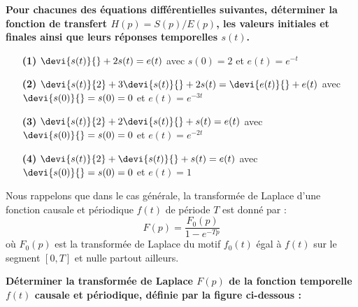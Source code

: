 \question{}
\textbf{Pour chacunes des équations différentielles suivantes, 
déterminer la fonction de transfert $H(p) = S(p)/E(p)$, les valeurs initiales
et finales ainsi que leurs réponses temporelles $s(t)$.}
\begin{itemize}
\item[\textbf{(1)}] $\devi{s(t)}{} + 2s(t) = e(t) $ avec $s(0)=2$ 
                    et $e(t) = e^{-t}$
\item[\textbf{(2)}] $\devi{s(t)}{2} + 3 \devi{s(t)}{} + 2s(t) 
                    = \devi{e(t)}{} + e(t)$ 
                    avec $\devi{s(0)}{}=s(0)=0$ et $e(t) = e^{-3t}$
\item[\textbf{(3)}] $\devi{s(t)}{2} + 2\devi{s(t)}{} + s(t)  = e(t)$ 
                    avec $\devi{s(0)}{}=s(0)=0$ et $e(t) = e^{-2t}$
\item[\textbf{(4)}] $\devi{s(t)}{2} + \devi{s(t)}{} + s(t) = e(t)$ 
                    avec $\devi{s(0)}{}=s(0)=0$ et $e(t) = 1$
\end{itemize}

Nous rappelons que dans le cas générale, 
la transformée de Laplace d'une fonction causale et périodique $f(t)$ de 
période $T$ est donné par :
\[
F(p) = \dfrac{F_0(p)}{1-e^{-Tp}}
\]
où $F_0(p)$ est la transformée de Laplace du motif $f_0(t)$ égal à $f(t)$ 
sur le segment $[0,T]$ et nulle partout ailleurs.

\question{}
\textbf{Déterminer la transformée de Laplace $F(p)$ de la fonction 
        temporelle $f(t)$ causale et périodique, définie par la figure 
        ci-dessous :}


